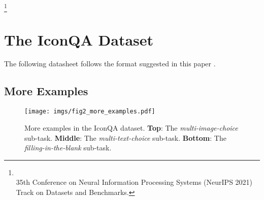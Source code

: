 \documentclass{article}
\begin{document}
\newcommand\blfootnote[1]{\begingroup
  \renewcommand\thefootnote{}\footnote{#1}\addtocounter{footnote}{-1}\endgroup
}

\blfootnote{
    \footnotesize 
    \\35th Conference on Neural Information Processing Systems (NeurIPS 2021) Track on Datasets and Benchmarks.
}


    
\section{The IconQA Dataset}
The following datasheet follows the format suggested in this paper \cite{gebru2018datasheets}.

\label{app_iconqa_data}

\subsection{More Examples}
\label{app_more_examples}

\begin{figure*}[ht!]
\centering 
    \texttt{[image: imgs/fig2\_more\_examples.pdf]}
    \vspace{0mm}
    \caption{More examples in the IconQA dataset. \textbf{Top}: The \textit{multi-image-choice} sub-task. \textbf{Middle}: The \textit{multi-text-choice} sub-task. \textbf{Bottom}: The \textit{filling-in-the-blank} sub-task.}
    \vspace{-1mm}
\label{fig2:more_examples}
\end{figure*}
\end{document}
